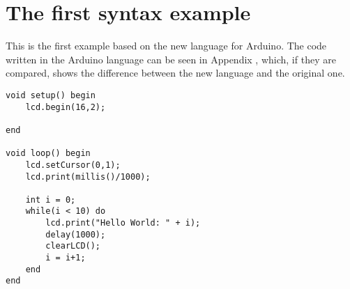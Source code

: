 \section{The first syntax example}
This is the first example based on the new language for Arduino. The code written in the Arduino language can be seen in Appendix , which, if they are compared, shows the difference between the new language and the original one.
\begin{lstlisting}
void setup() begin
    lcd.begin(16,2);
    
end

void loop() begin
    lcd.setCursor(0,1);
    lcd.print(millis()/1000);
    
    int i = 0;
    while(i < 10) do
        lcd.print("Hello World: " + i);
        delay(1000);
        clearLCD();
        i = i+1;
    end
end
\end{lstlisting}
